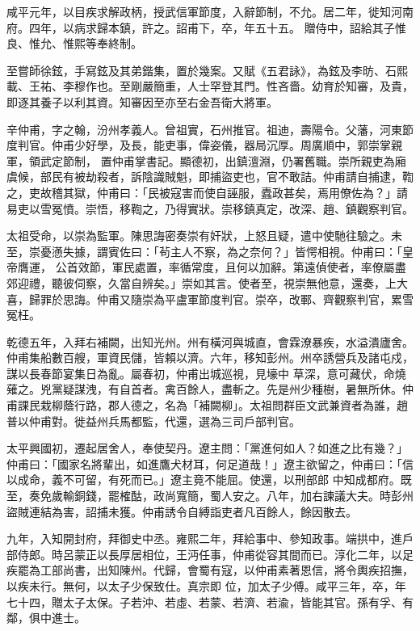 \begin{pinyinscope}
 咸平元年，以目疾求解政柄，授武信軍節度，入辭節制，不允。居二年，徙知河南府。四年，以病求歸本鎮，許之。詔甫下，卒，年五十五。
 贈侍中，詔給其子惟良、惟允、惟熙等奉終制。



 至嘗師徐鉉，手寫鉉及其弟鍇集，置於幾案。又賦《五君詠》，為鉉及李昉、石熙載、王祐、李穆作也。至剛嚴簡重，人士罕登其門。性吝嗇。幼育於知審，及貴，即逐其養子以利其資。知審因至亦至右金吾衛大將軍。



 辛仲甫，字之翰，汾州孝義人。曾祖實，石州推官。祖迪，壽陽令。父藩，河東節度判官。仲甫少好學，及長，能吏事，偉姿儀，器局沉厚。周廣順中，郭崇掌親軍，領武定節制，
 置仲甫掌書記。顯德初，出鎮澶淵，仍署舊職。崇所親吏為廂虞候，部民有被劫殺者，訴陰識賊魁，即捕盜吏也，官不敢詰。仲甫請自捕逮，鞫之，吏故稽其獄，仲甫曰：「民被寇害而使自誣服，蠹政甚矣，焉用僚佐為？」請易吏以雪冤憤。崇悟，移鞫之，乃得實狀。崇移鎮真定，改深、趙、鎮觀察判官。



 太祖受命，以崇為監軍。陳思誨密奏崇有奸狀，上怒且疑，遣中使馳往驗之。未至，崇憂懣失據，謂賓佐曰：「茍主人不察，為之奈何？」皆愕相視。仲甫曰：「皇帝膺運，
 公首效節，軍民處置，率循常度，且何以加辭。第遠偵使者，率僚屬盡郊迎禮，聽彼伺察，久當自辨矣。」崇如其言。使者至，視崇無他意，還奏，上大喜，歸罪於思誨。仲甫又隨崇為平盧軍節度判官。崇卒，改鄆、齊觀察判官，累雪冤枉。



 乾德五年，入拜右補闕，出知光州。州有橫河與城直，會霖潦暴疾，水溢潰廬舍。仲甫集船數百艘，軍資民儲，皆賴以濟。六年，移知彭州。州卒誘營兵及諸屯戍，謀以長春節宴集日為亂。屬春初，仲甫出城巡視，見壕中
 草深，意可藏伏，命燒薙之。兇黨疑謀洩，有自首者。禽百餘人，盡斬之。先是州少種樹，暑無所休。仲甫課民栽柳蔭行路，郡人德之，名為「補闕柳」。太祖問群臣文武兼資者為誰，趙普以仲甫對。徙益州兵馬都監，代還，選為三司戶部判官。



 太平興國初，遷起居舍人，奉使契丹。遼主問：「黨進何如人？如進之比有幾？」仲甫曰：「國家名將輩出，如進鷹犬材耳，何足道哉！」遼主欲留之，仲甫曰：「信以成命，義不可留，有死而已。」遼主竟不能屈。使還，以刑部郎
 中知成都府。既至，奏免歲輸銅錢，罷榷酤，政尚寬簡，蜀人安之。八年，加右諫議大夫。時彭州盜賊連結為害，詔捕未獲。仲甫誘令自縛詣吏者凡百餘人，餘因散去。



 九年，入知開封府，拜御史中丞。雍熙二年，拜給事中、參知政事。端拱中，進戶部侍郎。時呂蒙正以長厚居相位，王沔任事，仲甫從容其間而已。淳化二年，以足疾罷為工部尚書，出知陳州。代歸，會蜀有寇，以仲甫素著恩信，將令輿疾招撫，以疾未行。無何，以太子少保致仕。真宗即
 位，加太子少傅。咸平三年，卒，年七十四，贈太子太保。子若沖、若虛、若蒙、若濟、若渝，皆能其官。孫有孚、有鄰，俱中進士。




\end{pinyinscope}
